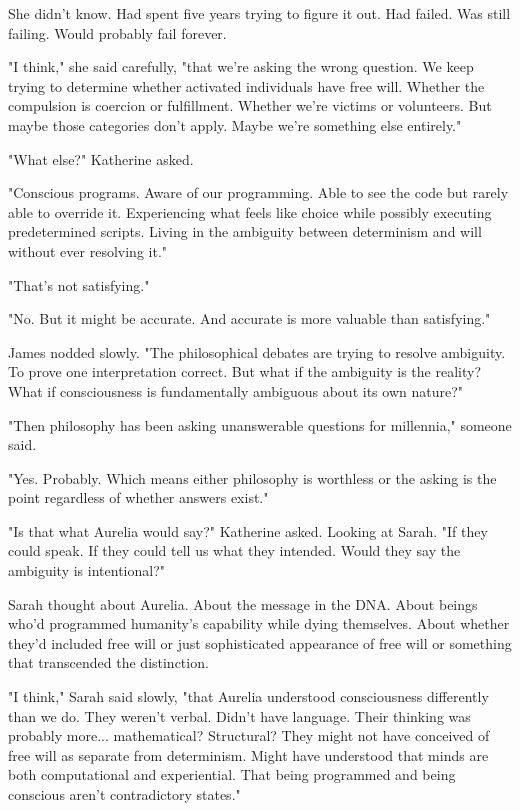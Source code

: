 She didn't know. Had spent five years trying to figure it out. Had failed. Was still failing. Would probably fail forever.

"I think," she said carefully, "that we're asking the wrong question. We keep trying to determine whether activated individuals have free will. Whether the compulsion is coercion or fulfillment. Whether we're victims or volunteers. But maybe those categories don't apply. Maybe we're something else entirely."

"What else?" Katherine asked.

"Conscious programs. Aware of our programming. Able to see the code but rarely able to override it. Experiencing what feels like choice while possibly executing predetermined scripts. Living in the ambiguity between determinism and will without ever resolving it."

"That's not satisfying."

"No. But it might be accurate. And accurate is more valuable than satisfying."

James nodded slowly. "The philosophical debates are trying to resolve ambiguity. To prove one interpretation correct. But what if the ambiguity is the reality? What if consciousness is fundamentally ambiguous about its own nature?"

"Then philosophy has been asking unanswerable questions for millennia," someone said.

"Yes. Probably. Which means either philosophy is worthless or the asking is the point regardless of whether answers exist."

"Is that what Aurelia would say?" Katherine asked. Looking at Sarah. "If they could speak. If they could tell us what they intended. Would they say the ambiguity is intentional?"

Sarah thought about Aurelia. About the message in the DNA. About beings who'd programmed humanity's capability while dying themselves. About whether they'd included free will or just sophisticated appearance of free will or something that transcended the distinction.

"I think," Sarah said slowly, "that Aurelia understood consciousness differently than we do. They weren't verbal. Didn't have language. Their thinking was probably more... mathematical? Structural? They might not have conceived of free will as separate from determinism. Might have understood that minds are both computational and experiential. That being programmed and being conscious aren't contradictory states."

